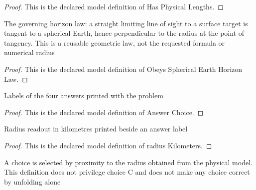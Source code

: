 \begin{proof}
  This is the declared model definition of Has Physical Lengths.
\end{proof}
\begin{definition}
  \label{def:physics:phyx-mini-0726:phyxminiproblems-problemphyxmini0726-obeyssphericalearthhorizonlaw}
  The governing horizon law: a straight limiting line of sight to a surface target is tangent to a spherical Earth, hence perpendicular to the radius at the point of tangency. This is a reusable geometric law, not the requested formula or numerical radius
\end{definition}
\begin{proof}
  This is the declared model definition of Obeys Spherical Earth Horizon Law.
\end{proof}
\begin{definition}
  \label{def:physics:phyx-mini-0726:phyxminiproblems-problemphyxmini0726-answerchoice}
  Labels of the four answers printed with the problem
\end{definition}
\begin{proof}
  This is the declared model definition of Answer Choice.
\end{proof}
\begin{definition}
  \label{def:physics:phyx-mini-0726:phyxminiproblems-problemphyxmini0726-answerchoice-radiuskilometers}
  Radius readout in kilometres printed beside an answer label
\end{definition}
\begin{proof}
  This is the declared model definition of radius Kilometers.
\end{proof}
\begin{definition}
  \label{def:physics:phyx-mini-0726:phyxminiproblems-problemphyxmini0726-isclosestdisplayedradius}
  A choice is selected by proximity to the radius obtained from the physical model. This definition does not privilege choice C and does not make any choice correct by unfolding alone
\end{definition}
